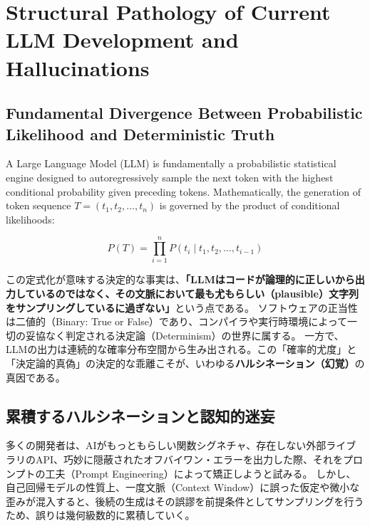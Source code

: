 \documentclass[11pt,a4paper,openany]{book}
\newif\ifja
\begin{document}
  \chapter{Structural Pathology of Current LLM Development and Hallucinations}
  \section{Fundamental Divergence Between Probabilistic Likelihood and Deterministic Truth}
  A Large Language Model (LLM) is fundamentally a probabilistic statistical engine designed to autoregressively sample the next token with the highest conditional probability given preceding tokens.
  Mathematically, the generation of token sequence $T = (t_1, t_2, \dots, t_n)$ is governed by the product of conditional likelihoods:
\fi

\begin{equation}
P(T) = \prod_{i=1}^n P(t_i \mid t_1, t_2, \dots, t_{i-1})
\end{equation}

\ifja
  この定式化が意味する決定的な事実は、\textbf{「LLMはコードが論理的に正しいから出力しているのではなく、その文脈において最も尤もらしい（plausible）文字列をサンプリングしているに過ぎない」}という点である。
  ソフトウェアの正当性は二値的（Binary: True or False）であり、コンパイラや実行時環境によって一切の妥協なく判定される決定論（Determinism）の世界に属する。
  一方で、LLMの出力は連続的な確率分布空間から生み出される。この「確率的尤度」と「決定論的真偽」の決定的な乖離こそが、いわゆる\textbf{ハルシネーション（幻覚）}の真因である。

  \section{累積するハルシネーションと認知的迷妄}
  多くの開発者は、AIがもっともらしい関数シグネチャ、存在しない外部ライブラリのAPI、巧妙に隠蔽されたオフバイワン・エラーを出力した際、それをプロンプトの工夫（Prompt Engineering）によって矯正しようと試みる。
  しかし、自己回帰モデルの性質上、一度文脈（Context Window）に誤った仮定や微小な歪みが混入すると、後続の生成はその誤謬を前提条件としてサンプリングを行うため、誤りは幾何級数的に累積していく。
\end{document}
